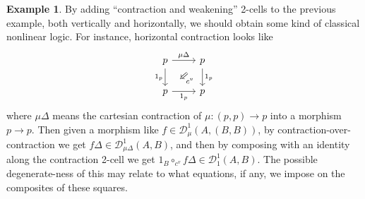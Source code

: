 \documentclass{article}
\theoremstyle{definition}
\newtheorem{eg}{Example}
\def\DD#1#2{\mathcal{D}^{#1}_{#2}}
\begin{document}
\begin{eg}\label{eg:nonlinear}
  By adding ``contraction and weakening'' 2-cells to the previous example, both vertically and horizontally, we should obtain some kind of classical nonlinear logic.
  For instance, horizontal contraction looks like
  \[\begin{tikzcd}
    p \ar[r,"\mu \Delta"] \ar[d,swap,"1_p"]
    \ar[from=r,to=d,phantom,""{name=1,near start},""{name=2,near end}]
    \ar[Rightarrow,from=1,to=2,"c^v"]
    & p \ar[d,"1_p"]
    \\ p \ar[r,swap,"1_p"] & p
  \end{tikzcd}\]
  where $\mu\Delta$ means the cartesian contraction of $\mu:(p,p)\to p$ into a morphism $p\to p$.
  Then given a morphism like $f\in \DD{1}{\mu}(A,(B,B))$, by contraction-over-contraction we get $f\Delta \in \DD{1}{\mu\Delta}(A,B)$, and then by composing with an identity along the contraction 2-cell we get $1_B \circ_{c^v} f\Delta \in \DD{1}{1}(A,B)$.
  The possible degenerate-ness of this may relate to what equations, if any, we impose on the composites of these squares.
\end{eg}
\end{document}

